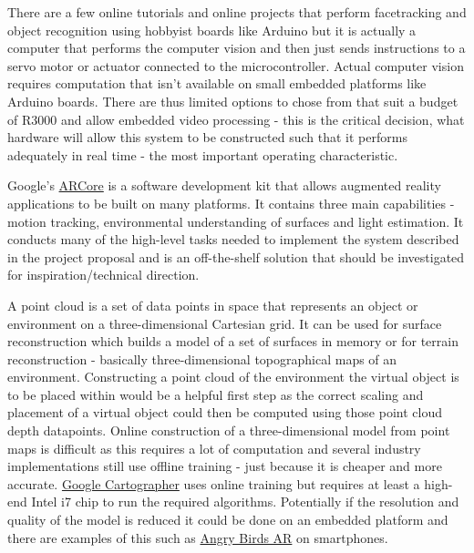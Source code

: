There are a few online tutorials and online projects that perform facetracking and object recognition using hobbyist boards like Arduino but it is actually a computer that performs the computer vision and then just sends instructions to a servo motor or actuator connected to the microcontroller. Actual computer vision requires computation that isn't available on small embedded platforms like Arduino boards. There are thus limited options to chose from that suit a budget of R3000 and allow embedded video processing - this is the critical decision, what hardware will allow this system to be constructed such that it performs adequately in real time - the most important operating characteristic. \newline

Google's \href{https://developers.google.com/ar/develop}{ARCore} is a software development kit that allows augmented reality applications to be built on many platforms. It contains three main capabilities - motion tracking, environmental understanding of surfaces and light estimation. It conducts many of the high-level tasks needed to implement the system described in the project proposal and is an off-the-shelf solution that should be investigated for inspiration/technical direction.

A point cloud is a set of data points in space that represents an object or environment on a three-dimensional Cartesian grid. It can be used for surface reconstruction which builds a model of a set of surfaces in memory or for terrain reconstruction - basically three-dimensional topographical maps of an environment. Constructing a point cloud of the environment the virtual object is to be placed within would be a helpful first step as the correct scaling and placement of a virtual object could then be computed using those point cloud depth datapoints. Online construction of a three-dimensional model from point maps is difficult as this requires a lot of computation and several industry implementations still use offline training - just because it is cheaper and more accurate. \href{https://google-cartographer-ros.readthedocs.io/en/latest/}{Google Cartographer} uses online training but requires at least a high-end Intel i7 chip to run the required algorithms. Potentially if the resolution and quality of the model is reduced it could be done on an embedded platform and there are examples of this such as \href{https://play.google.com/store/apps/details?id=com.rovio.abar&hl=en_ZA&gl=US}{Angry Birds AR} on smartphones. \newline

